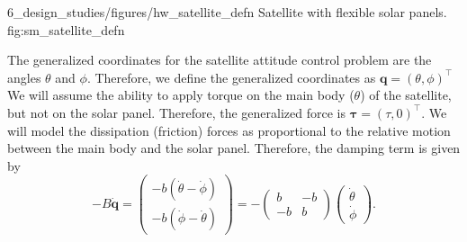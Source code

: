 
	{6_design_studies/figures/hw_satellite_defn}
	{Satellite with flexible solar panels.}
	{fig:sm_satellite_defn}


The generalized coordinates for the satellite attitude control problem are the angles $\theta$ and $\phi$.  Therefore, we define the generalized coordinates as $\mathbf{q}=(\theta, \phi)^\top$  We will assume the ability to apply torque on the main body ($\theta$) of the satellite, but not on the solar panel.  Therefore, the generalized force is $\boldsymbol{\tau} = (\tau, 0)^\top$.  We will model the dissipation (friction) forces as proportional to the relative motion between the main body and the solar panel.  Therefore, the damping term is given by
\[
-B\dot{\mathbf{q}} = \begin{pmatrix}-b(\dot{\theta}-\dot{\phi}) \\ -b(\dot{\phi}-\dot{\theta}) \end{pmatrix} = -\begin{pmatrix} b & -b \\ -b & b \end{pmatrix}\begin{pmatrix}\dot{\theta} \\ \dot{\phi}\end{pmatrix}.
\]

